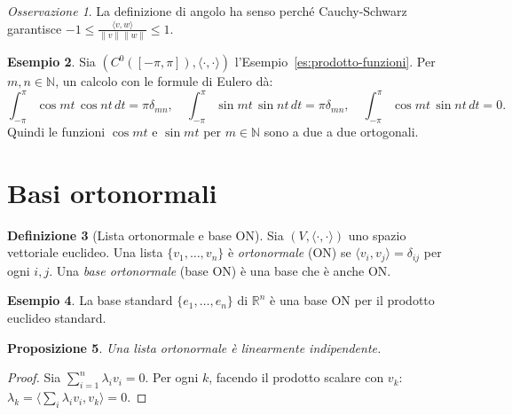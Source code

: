 \documentclass[11pt, a4paper]{book}
\theoremstyle{definition}
\newtheorem{definizione}{Definizione}[section]
\newtheorem{esempio}[definizione]{Esempio}
\theoremstyle{plain}
\newtheorem{proposizione}[definizione]{Proposizione}
\theoremstyle{remark}
\newtheorem{osservazione}[definizione]{Osservazione}
\newcommand{\N}{\mathbb{N}}
\newcommand{\R}{\mathbb{R}}
\begin{document}
\begin{osservazione}
La definizione di angolo ha senso perché Cauchy-Schwarz garantisce $-1 \leq \frac{\langle v,w\rangle}{\|v\|\|w\|} \leq 1$.
\end{osservazione}

\begin{exbox}
\begin{esempio}
Sia $(C^0([-\pi,\pi]),\langle\cdot,\cdot\rangle)$ l'Esempio~\ref{es:prodotto-funzioni}. Per $m,n \in \N$, un calcolo con le formule di Eulero dà:
\[
  \int_{-\pi}^{\pi}\cos mt\,\cos nt\,dt = \pi\delta_{mn},\quad
  \int_{-\pi}^{\pi}\sin mt\,\sin nt\,dt = \pi\delta_{mn},\quad
  \int_{-\pi}^{\pi}\cos mt\,\sin nt\,dt = 0.
\]
Quindi le funzioni $\cos mt$ e $\sin mt$ per $m \in \N$ sono a due a due ortogonali.
\end{esempio}
\end{exbox}

\section{Basi ortonormali}
\label{sec:basi-ON}

\begin{defbox}
\begin{definizione}[Lista ortonormale e base ON]
\label{def:base-ON}
Sia $(V,\langle\cdot,\cdot\rangle)$ uno spazio vettoriale euclideo. Una lista $\{v_1,\ldots,v_n\}$ è \emph{ortonormale} (ON) se $\langle v_i,v_j\rangle = \delta_{ij}$ per ogni $i,j$. Una \emph{base ortonormale} (base ON) è una base che è anche ON.
\end{definizione}
\end{defbox}

\begin{exbox}
\begin{esempio}
La base standard $\{e_1,\ldots,e_n\}$ di $\R^n$ è una base ON per il prodotto euclideo standard.
\end{esempio}
\end{exbox}

\begin{proposizione}
\label{prop:ON-indipendenti}
Una lista ortonormale è linearmente indipendente.
\end{proposizione}

\begin{proof}
Sia $\sum_{i=1}^n \lambda_i v_i = 0$. Per ogni $k$, facendo il prodotto scalare con $v_k$: $\lambda_k = \langle \sum_i \lambda_i v_i, v_k\rangle = 0$.
\end{proof}
\end{document}
